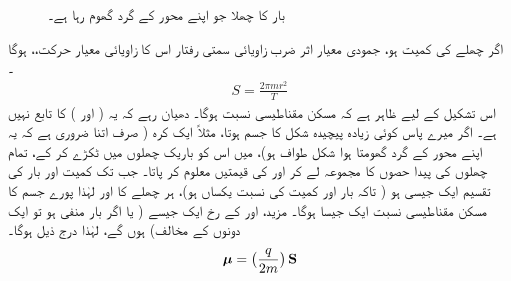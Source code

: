 \begin{figure}
\centering
{}
\caption{بار کا چھلا جو اپنے محور کے گرد گھوم رہا ہے۔}
\label{شکل_غیر_تابع_اضطراب_چھلا_بار}
\end{figure}

اگر چھلے کی کمیت  ہو،  جمودی معیار اثر  ضرب زاویائی سمتی رفتار  اس کا زاویائی معیار حرکت،، ہوگا ۔
\begin{align*} 
S = \frac{2 \pi mr^2}{T}
\end{align*}
اس  تشکیل   کے لیے ظاہر ہے کہ مسکن مقناطیسی نسبت  ہوگا۔  دھیان رہے کہ یہ  ( اور )  کا  تابع نہیں  ہے۔  اگر میرے پاس کوئی زیادہ پیچیدہ شکل  کا جسم ہوتا،  مثلاً   ایک  کرہ (  صرف اتنا ضروری ہے کہ یہ اپنے محور کے گرد گھومتا ہوا  شکل طواف ہو)،   میں اس کو باریک چھلوں میں ٹکڑے کر کے،  تمام  چھلوں  کی  پیدا حصوں کا مجموعہ لے کر  اور  کی قیمتیں معلوم کر پاتا۔ جب تک کمیت اور بار کی تقسیم ایک جیسی ہو ( تاکہ بار اور کمیت کی نسبت یکساں ہو)،  ہر  چھلے  کا اور لہٰذا   پورے جسم کا مسکن مقناطیسی نسبت ایک  جیسا ہوگا۔ مزید،   اور  کے رخ ایک  جیسے ( یا اگر بار منفی ہو تو ایک دونوں کے مخالف)  ہوں گے،  لہٰذا   درج ذیل ہوگا۔ 
\begin{align*}
{\ensuremath{{\boldsymbol{\mu}}}} = \big ( \frac{q}{2m} \big ) \operatorname{\mathbf{S}}
\end{align*}

